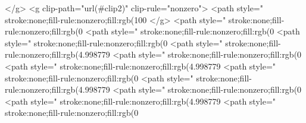 </g>
<g clip-path="url(#clip2)" clip-rule="nonzero">
<path style=" stroke:none;fill-rule:nonzero;fill:rgb(100%
</g>
<path style=" stroke:none;fill-rule:nonzero;fill:rgb(0%
<path style=" stroke:none;fill-rule:nonzero;fill:rgb(0%
<path style=" stroke:none;fill-rule:nonzero;fill:rgb(0%
<path style=" stroke:none;fill-rule:nonzero;fill:rgb(4.998779%
<path style=" stroke:none;fill-rule:nonzero;fill:rgb(0%
<path style=" stroke:none;fill-rule:nonzero;fill:rgb(4.998779%
<path style=" stroke:none;fill-rule:nonzero;fill:rgb(0%
<path style=" stroke:none;fill-rule:nonzero;fill:rgb(4.998779%
<path style=" stroke:none;fill-rule:nonzero;fill:rgb(0%
<path style=" stroke:none;fill-rule:nonzero;fill:rgb(4.998779%
<path style=" stroke:none;fill-rule:nonzero;fill:rgb(0%
